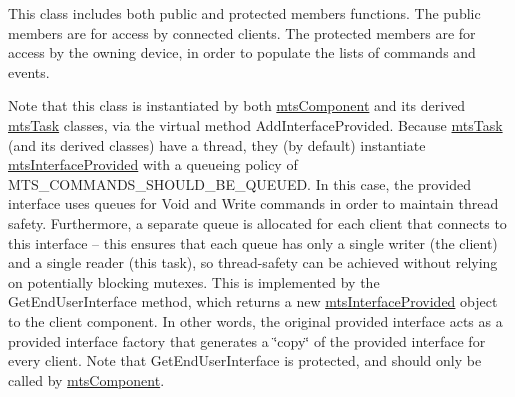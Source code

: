 This class includes both public and protected members functions. The public members are for access by connected clients. The protected members are for access by the owning device, in order to populate the lists of commands and events.

Note that this class is instantiated by both \hyperlink{classmts_component}{mts\-Component} and its derived \hyperlink{classmts_task}{mts\-Task} classes, via the virtual method Add\-Interface\-Provided. Because \hyperlink{classmts_task}{mts\-Task} (and its derived classes) have a thread, they (by default) instantiate \hyperlink{classmts_interface_provided}{mts\-Interface\-Provided} with a queueing policy of M\-T\-S\-\_\-\-C\-O\-M\-M\-A\-N\-D\-S\-\_\-\-S\-H\-O\-U\-L\-D\-\_\-\-B\-E\-\_\-\-Q\-U\-E\-U\-E\-D. In this case, the provided interface uses queues for Void and Write commands in order to maintain thread safety. Furthermore, a separate queue is allocated for each client that connects to this interface -- this ensures that each queue has only a single writer (the client) and a single reader (this task), so thread-\/safety can be achieved without relying on potentially blocking mutexes. This is implemented by the Get\-End\-User\-Interface method, which returns a new \hyperlink{classmts_interface_provided}{mts\-Interface\-Provided} object to the client component. In other words, the original provided interface acts as a provided interface factory that generates a \char`\"{}copy\char`\"{} of the provided interface for every client. Note that Get\-End\-User\-Interface is protected, and should only be called by \hyperlink{classmts_component}{mts\-Component}. 

